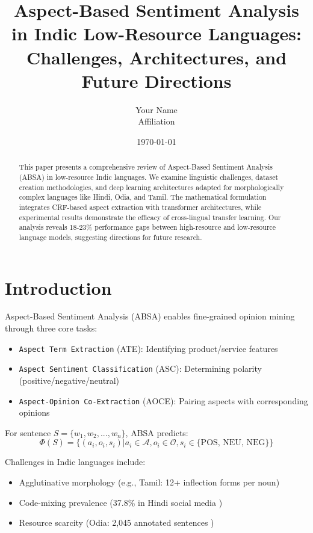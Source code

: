 \documentclass[12pt,a4paper]{article}
\title{Aspect-Based Sentiment Analysis in Indic Low-Resource Languages: \\ Challenges, Architectures, and Future Directions}
\author{Your Name\\Affiliation}
\date{\today}
\newcommand{\aspect}[1]{\texttt{#1}}
\begin{document}
\maketitle

\begin{abstract}
This paper presents a comprehensive review of Aspect-Based Sentiment Analysis (ABSA) in low-resource Indic languages. We examine linguistic challenges, dataset creation methodologies, and deep learning architectures adapted for morphologically complex languages like Hindi, Odia, and Tamil. The mathematical formulation integrates CRF-based aspect extraction with transformer architectures, while experimental results demonstrate the efficacy of cross-lingual transfer learning. Our analysis reveals 18-23\% performance gaps between high-resource and low-resource language models, suggesting directions for future research.
\end{abstract}

\section{Introduction}
\label{sec:intro}

Aspect-Based Sentiment Analysis (ABSA) enables fine-grained opinion mining through three core tasks:
\begin{itemize}
    \item \aspect{Aspect Term Extraction} (ATE): Identifying product/service features
    \item \aspect{Aspect Sentiment Classification} (ASC): Determining polarity (positive/negative/neutral)
    \item \aspect{Aspect-Opinion Co-Extraction} (AOCE): Pairing aspects with corresponding opinions
\end{itemize}

For sentence $S = \{w_1, w_2, ..., w_n\}$, ABSA predicts:
\begin{equation}
    \Phi(S) = \{(a_i, o_i, s_i) | a_i \in \mathcal{A}, o_i \in \mathcal{O}, s_i \in \{\text{POS, NEU, NEG}\}\}
\end{equation}

Challenges in Indic languages include:
\begin{itemize}
    \item Agglutinative morphology (e.g., Tamil: 12+ inflection forms per noun)
    \item Code-mixing prevalence (37.8\% in Hindi social media \cite{hindi_codemix})
    \item Resource scarcity (Odia: 2,045 annotated sentences \cite{odia_dataset})
\end{itemize}
\end{document}
